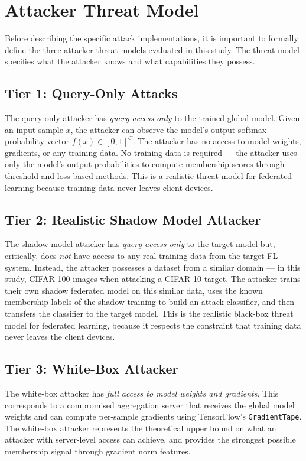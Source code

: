 \documentclass[12pt, a4paper]{report}
\begin{document}
\section{Attacker Threat Model}

Before describing the specific attack implementations, it is important to formally
define the three attacker threat models evaluated in this study. The threat model
specifies what the attacker knows and what capabilities they possess.

\subsection{Tier 1: Query-Only Attacks}

The query-only attacker has \textit{query access only} to the trained global model.
Given an input sample $x$, the attacker can observe the model's output softmax
probability vector $f(x) \in [0,1]^C$. The attacker has no access to model
weights, gradients, or any training data. No training data is required ---
the attacker uses only the model's output probabilities to compute membership
scores through threshold and loss-based methods. This is a realistic threat
model for federated learning because training data never leaves client devices.

\subsection{Tier 2: Realistic Shadow Model Attacker}

The shadow model attacker has \textit{query access only} to the target model but,
critically, does \textit{not} have access to any real training data from the target
FL system. Instead, the attacker possesses a dataset from a similar domain ---
in this study, CIFAR-100 images when attacking a CIFAR-10 target. The attacker
trains their own shadow federated model on this similar data, uses the known
membership labels of the shadow training to build an attack classifier, and then
transfers the classifier to the target model. This is the realistic black-box
threat model for federated learning, because it respects the constraint that
training data never leaves the client devices.

\subsection{Tier 3: White-Box Attacker}

The white-box attacker has \textit{full access to model weights and gradients}.
This corresponds to a compromised aggregation server that receives the global
model weights and can compute per-sample gradients using TensorFlow's
\texttt{GradientTape}. The white-box attacker represents the theoretical upper
bound on what an attacker with server-level access can achieve, and provides the
strongest possible membership signal through gradient norm features.
\end{document}
